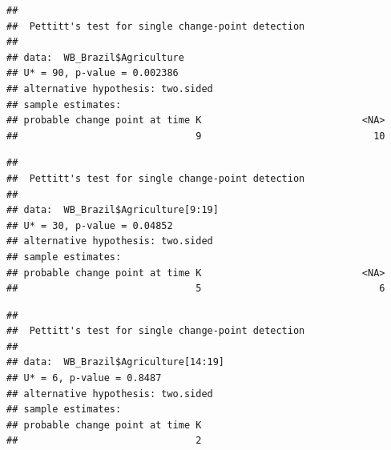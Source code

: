 \documentclass[12pt,]{article}
\newenvironment{Shaded}{\begin{snugshade}}{\end{snugshade}}
\newcommand{\KeywordTok}[1]{\textcolor[rgb]{0.13,0.29,0.53}{\textbf{#1}}}
\newcommand{\DecValTok}[1]{\textcolor[rgb]{0.00,0.00,0.81}{#1}}
\newcommand{\CommentTok}[1]{\textcolor[rgb]{0.56,0.35,0.01}{\textit{#1}}}
\newcommand{\OperatorTok}[1]{\textcolor[rgb]{0.81,0.36,0.00}{\textbf{#1}}}
\newcommand{\NormalTok}[1]{#1}
\begin{document}
\begin{verbatim}
## 
##  Pettitt's test for single change-point detection
## 
## data:  WB_Brazil$Agriculture
## U* = 90, p-value = 0.002386
## alternative hypothesis: two.sided
## sample estimates:
## probable change point at time K                            <NA> 
##                               9                              10
\end{verbatim}

\begin{Shaded}
\end{Shaded}

\begin{verbatim}
## 
##  Pettitt's test for single change-point detection
## 
## data:  WB_Brazil$Agriculture[9:19]
## U* = 30, p-value = 0.04852
## alternative hypothesis: two.sided
## sample estimates:
## probable change point at time K                            <NA> 
##                               5                               6
\end{verbatim}

\begin{Shaded}
\end{Shaded}

\begin{verbatim}
## 
##  Pettitt's test for single change-point detection
## 
## data:  WB_Brazil$Agriculture[14:19]
## U* = 6, p-value = 0.8487
## alternative hypothesis: two.sided
## sample estimates:
## probable change point at time K 
##                               2
\end{verbatim}

\begin{Shaded}
\end{Shaded}
\end{document}
